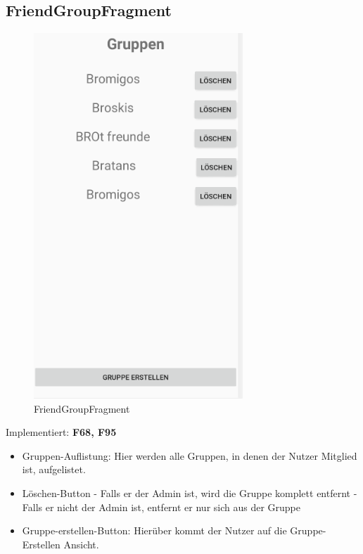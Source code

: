 \subsection{FriendGroupFragment}
\begin{figure}[H]
	\centering
	\includegraphics[width=0.7\textwidth]{pics/friendGroupFragment.png}%
	\caption{FriendGroupFragment}%
	\label{view}%
\end{figure}
Implementiert: \textbf{F68, F95}
\begin{itemize}[nosep]
	\item Gruppen-Auflistung: Hier werden alle Gruppen, in denen der Nutzer Mitglied ist, aufgelistet. 
	\item Löschen-Button
	\subitem - Falls er der Admin ist, wird die Gruppe komplett entfernt
	\subitem - Falls er nicht der Admin ist, entfernt er nur sich aus der Gruppe
	\item Gruppe-erstellen-Button: Hierüber kommt der Nutzer auf die Gruppe-Erstellen Ansicht.
\end{itemize}

